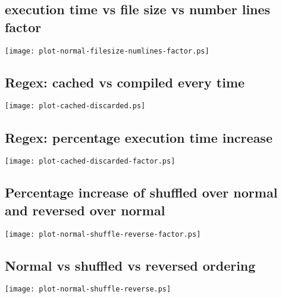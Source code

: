 \documentclass[a4paper,12pt,draft]{article}
\begin{document}
\subsection{execution time vs file size vs number lines factor}
\label{execution time vs file size vs number lines factor}
\texttt{[image: plot-normal-filesize-numlines-factor.ps]}


\subsection{Regex: cached vs compiled every time}
\label{normal regex vs discard regex}
\texttt{[image: plot-cached-discarded.ps]}


\subsection{Regex: percentage execution time increase}
\label{normal regex vs disarded regex factor}
\texttt{[image: plot-cached-discarded-factor.ps]}


\subsection{Percentage increase of shuffled over normal and reversed over normal}
\label{normal vs shuffled vs reversed ordering factor}
\texttt{[image: plot-normal-shuffle-reverse-factor.ps]}


\subsection{Normal vs shuffled vs reversed ordering}
\label{normal vs shuffled vs reversed ordering}
\texttt{[image: plot-normal-shuffle-reverse.ps]}
\end{document}
